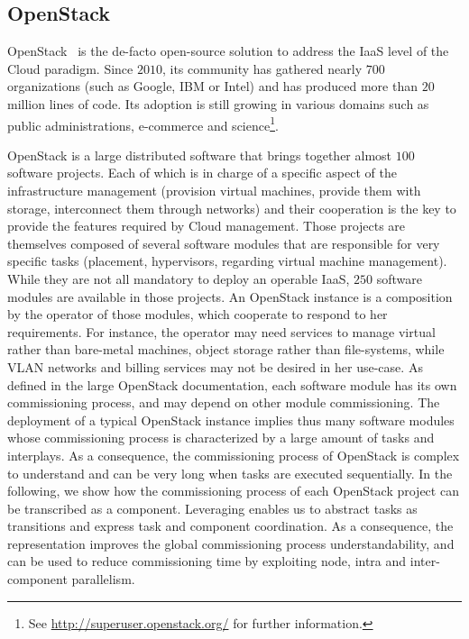 
\graphicspath{{images/}}

\subsection{OpenStack}
\label{subsec:openstack}

OpenStack~\cite{os:7923796} is the de-facto open-source solution to address the
IaaS level of the Cloud paradigm. Since $2010$, its community has gathered
nearly $700$ organizations (such as Google, IBM or Intel) and has produced more
than $20$ million lines of code. Its adoption is still growing in various
domains such as public administrations, e-commerce and science\footnote{See
\url{http://superuser.openstack.org/} for further information.}.

OpenStack is a large distributed software that brings together almost $100$
software projects. Each of which is in charge of a specific aspect of the
infrastructure management (\eg provision virtual machines, provide them with
storage, interconnect them through networks) and their cooperation is the key to
provide the features required by Cloud management.
%
Those projects are themselves composed of several software modules that are
responsible for very specific tasks (\eg placement, hypervisors, regarding
virtual machine management). While they are not all mandatory to deploy an
operable IaaS, $250$ software modules are available in those projects.
%
An OpenStack instance is a composition by the operator of those modules, which
cooperate to respond to her requirements. For instance, the operator may need
services to manage virtual rather than bare-metal machines, object storage
rather than file-systems, while VLAN networks and billing services may not be
desired in her use-case. As defined in the large OpenStack documentation, each
software module has its own commissioning process, and may depend on other
module commissioning.
%
The deployment of a typical OpenStack instance implies thus many software
modules whose commissioning process is characterized by a large amount of tasks
and interplays. As a consequence, the commissioning process of OpenStack is
complex to understand and can be very long when tasks are executed sequentially.
%
In the following, we show how the commissioning process of each OpenStack
project can be transcribed as a \mad component. Leveraging \mad enables us to
abstract tasks as transitions and express task and component coordination. As a
consequence, the \mad representation improves the global commissioning process
understandability, and can be used to reduce commissioning time by exploiting
node, intra and inter-component parallelism.


